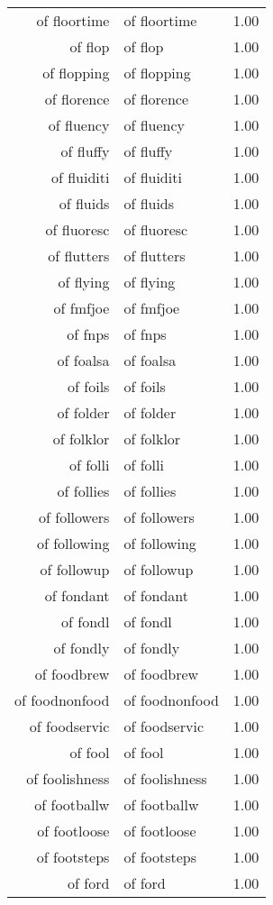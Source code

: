 \begin{table}[ht]
\begin{tabular}{rlr}
  of floortime & of floortime & 1.00 \\ 
  of flop & of flop & 1.00 \\ 
  of flopping & of flopping & 1.00 \\ 
  of florence & of florence & 1.00 \\ 
  of fluency & of fluency & 1.00 \\ 
  of fluffy & of fluffy & 1.00 \\ 
  of fluiditi & of fluiditi & 1.00 \\ 
  of fluids & of fluids & 1.00 \\ 
  of fluoresc & of fluoresc & 1.00 \\ 
  of flutters & of flutters & 1.00 \\ 
  of flying & of flying & 1.00 \\ 
  of fmfjoe & of fmfjoe & 1.00 \\ 
  of fnps & of fnps & 1.00 \\ 
  of foalsa & of foalsa & 1.00 \\ 
  of foils & of foils & 1.00 \\ 
  of folder & of folder & 1.00 \\ 
  of folklor & of folklor & 1.00 \\ 
  of folli & of folli & 1.00 \\ 
  of follies & of follies & 1.00 \\ 
  of followers & of followers & 1.00 \\ 
  of following & of following & 1.00 \\ 
  of followup & of followup & 1.00 \\ 
  of fondant & of fondant & 1.00 \\ 
  of fondl & of fondl & 1.00 \\ 
  of fondly & of fondly & 1.00 \\ 
  of foodbrew & of foodbrew & 1.00 \\ 
  of foodnonfood & of foodnonfood & 1.00 \\ 
  of foodservic & of foodservic & 1.00 \\ 
  of fool & of fool & 1.00 \\ 
  of foolishness & of foolishness & 1.00 \\ 
  of footballw & of footballw & 1.00 \\ 
  of footloose & of footloose & 1.00 \\ 
  of footsteps & of footsteps & 1.00 \\ 
  of ford & of ford & 1.00 \\ 

\end{tabular}
\end{table}
